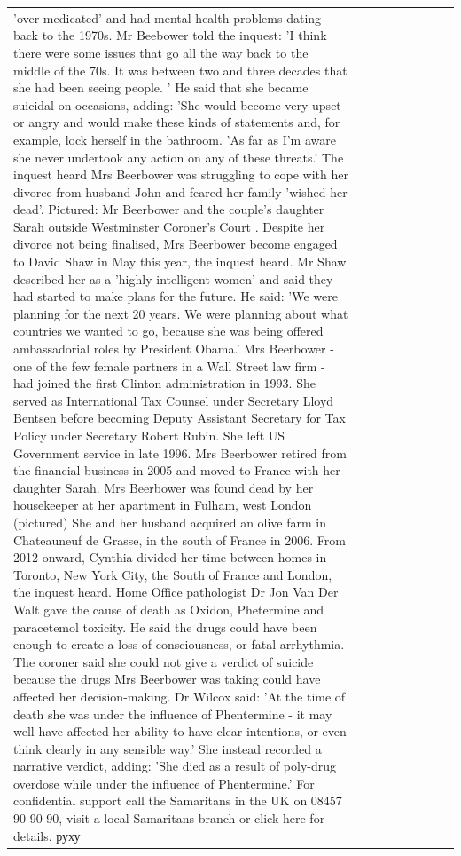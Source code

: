 \begin{table}[H]
\begin{tabular}{lllrlllll}
'over-medicated' and had mental health problems dating back to the 1970s. Mr Beebower told the inquest: 'I think there were some issues that go all the way back to the middle of the 70s. It was between two and three decades that she had been seeing people. ' He said that she became suicidal on occasions, adding: 'She would become very upset or angry and would make these kinds of statements and, for example, lock herself in the bathroom. 'As far as I'm aware she never undertook any action on any of these threats.' The inquest heard Mrs Beerbower was struggling to cope with her divorce from husband John and feared her family 'wished her dead'. Pictured: Mr Beerbower and the couple's daughter Sarah outside Westminster Coroner's Court . Despite her divorce not being finalised, Mrs Beerbower become engaged to David Shaw in May this year, the inquest heard. Mr Shaw described her as a 'highly intelligent women' and said they had started to make plans for the future. He said: 'We were planning for the next 20 years. We were planning about what countries we wanted to go, because she was being offered ambassadorial roles by President Obama.' Mrs Beerbower - one of the few female partners in a Wall Street law firm - had joined the first Clinton administration in 1993. She served as International Tax Counsel under Secretary Lloyd Bentsen before becoming Deputy Assistant Secretary for Tax Policy under Secretary Robert Rubin. She left US Government service in late 1996. Mrs Beerbower retired from the financial business in 2005 and moved to France with her daughter Sarah. Mrs Beerbower was found dead by her housekeeper at her apartment in Fulham, west London (pictured) She and her husband acquired an olive farm in Chateauneuf de Grasse, in the south of France in 2006. From 2012 onward, Cynthia divided her time between homes in Toronto, New York City, the South of France and London, the inquest heard. Home Office pathologist Dr Jon Van Der Walt gave the cause of death as Oxidon, Phetermine and paracetemol toxicity. He said the drugs could have been enough to create a loss of consciousness, or fatal arrhythmia. The coroner said she could not give a verdict of suicide because the drugs Mrs Beerbower was taking could have affected her decision-making. Dr Wilcox said: 'At the time of death she was under the influence of Phentermine - it may well have affected her ability to have clear intentions, or even think clearly in any sensible way.' She instead recorded a narrative verdict, adding: 'She died as a result of poly-drug overdose while under the influence of Phentermine.' For confidential support call the Samaritans in the UK on 08457 90 90 90, visit a local Samaritans branch or click here for details. руху \\

\end{tabular}
\end{table}
